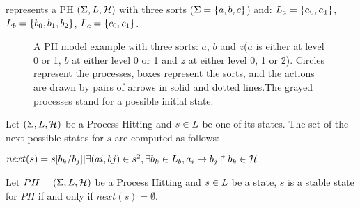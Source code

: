 \begin{example*}
 represents a PH $(\Sigma,L,\mathcal{H})$ with three sorts
($\Sigma = \{a, b, c\}$) and:
$L_a = \{a_0, a_1\}$,
$L_b = \{b_0, b_1, b_2\}$,
$L_c = \{c_0, c_1\}$.
\begin{figure}[ht]
\centering
{}
\caption{\label{fig:ph} 
A PH model example with three sorts: $a$, $b$ and $z$($a$ is either at level 0 or 1, $b$ at either level 0 or 1 and $z$ at either level 0, 1 or 2).
Circles represent the processes, boxes represent the sorts, and the actions are drawn by pairs of arrows in solid and dotted lines.The grayed processes stand for a possible initial state.
}
\end{figure}

\end{example*}

\begin{definition}
\label{def:NextState}
Let $(\Sigma,L,\mathcal{H})$ be a Process Hitting and $s \in L$ be
one of its states. The set of the next possible states for $s$ are computed as follows:
\begin{center}
$next(s) = {s[b_k /b_j ]| \exists (a i , b j ) \in s^2 , \exists b_k \in L_b , a_i\rightarrow b_j\Rsh b_k \in \mathcal{H}}$
\end{center}

\end{definition}

\begin{definition}
\label{def:FixPoint}
Let $PH = (\Sigma,L,\mathcal{H})$ be a Process Hitting and
$s \in L$ be a state, $s$ is a stable state for $PH$ if and only if $next(s) = \emptyset $.
\end{definition}

